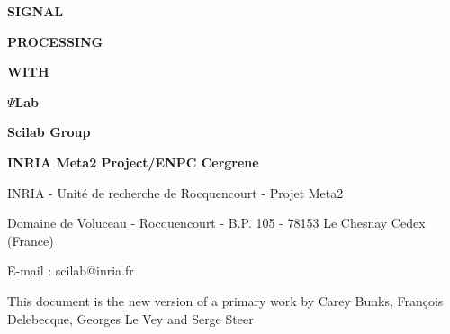 


\pagestyle{empty}



\newpage

\vspace{8.cm}

\Huge\bf  {SIGNAL}

\Huge\bf  {PROCESSING}

\Huge\bf  {WITH}

\Huge\bf  {$\Psi$Lab}



\vspace{3.cm}

\Huge\bf {Scilab Group}

\Large\bf
INRIA Meta2 Project/ENPC Cergrene

\normalsize

\vspace{12.cm}

INRIA - Unit\'e de recherche de Rocquencourt - Projet Meta2

Domaine de Voluceau - Rocquencourt - B.P. 105 - 78153 Le Chesnay Cedex (France)

E-mail : scilab@inria.fr



\normalsize

\newpage


\bigskip
\bigskip

This document is the new version of a primary work by
Carey Bunks, Fran\c{c}ois Delebecque, Georges Le Vey and Serge Steer



\tableofcontents

\pagestyle{headings}

